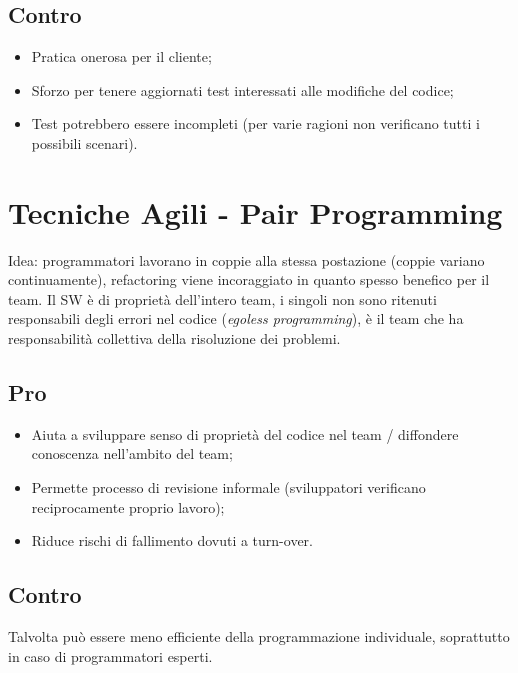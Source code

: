 \documentclass{article}
\begin{document}
    \subsection{Contro}
      \begin{itemize}
        \item Pratica onerosa per il cliente;
        \item Sforzo per tenere aggiornati test interessati alle modifiche del codice;
        \item Test potrebbero essere incompleti (per varie ragioni non verificano tutti i possibili scenari). 
      \end{itemize}
  \section{Tecniche Agili - Pair Programming}
    Idea: programmatori lavorano in coppie alla stessa postazione (coppie variano continuamente), refactoring viene incoraggiato in quanto spesso benefico per il team. Il SW è di proprietà dell'intero team, i singoli non sono ritenuti responsabili degli errori nel codice (\textit{egoless programming}), è il team che ha responsabilità collettiva della risoluzione dei problemi. 
    \subsection{Pro}
      \begin{itemize}
        \item Aiuta a sviluppare senso di proprietà del codice nel team / diffondere conoscenza nell'ambito del team;
        \item Permette processo di revisione informale (sviluppatori verificano reciprocamente proprio lavoro);
        \item Riduce rischi di fallimento dovuti a turn-over. 
      \end{itemize}
    \subsection{Contro}
      Talvolta può essere meno efficiente della programmazione individuale, soprattutto in caso di programmatori esperti.
\end{document}
